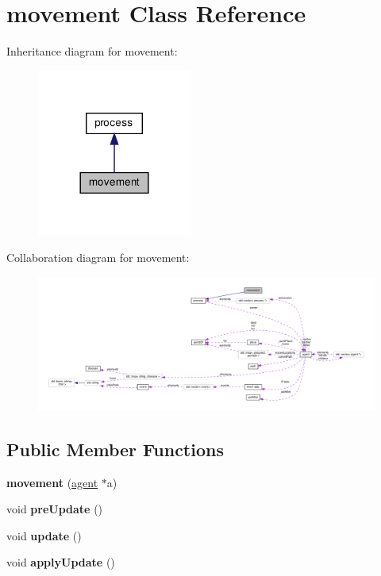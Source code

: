 \hypertarget{classmovement}{}\section{movement Class Reference}
\label{classmovement}


Inheritance diagram for movement\+:\nopagebreak
\begin{figure}[H]
\begin{center}
\leavevmode
\includegraphics[width=144pt]{classmovement__inherit__graph}
\end{center}
\end{figure}


Collaboration diagram for movement\+:\nopagebreak
\begin{figure}[H]
\begin{center}
\leavevmode
\includegraphics[width=350pt]{classmovement__coll__graph}
\end{center}
\end{figure}
\subsection*{Public Member Functions}
\begin{DoxyCompactItemize}
\item 
\mbox{\label{classmovement_aed3c0d8fffab4ddfcf671869eb3167fd}} 
{\bfseries movement} (\mbox{\hyperlink{classagent}{agent}} $\ast$a)
\item 
\mbox{\label{classmovement_aad069c445064e63352ae38b00deec2a9}} 
void {\bfseries pre\+Update} ()
\item 
\mbox{\label{classmovement_affebcf78f2f1f085a8daae74f699a132}} 
void {\bfseries update} ()
\item 
\mbox{\label{classmovement_a2b5e033ddb01a6df13826d9e3f2b253c}} 
void {\bfseries apply\+Update} ()
\end{DoxyCompactItemize}
